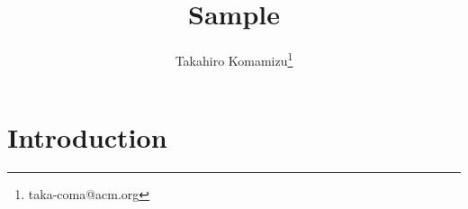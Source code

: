 \documentclass[twocolumn,10pt]{article}
\begin{document}
\title{
	Sample
}

\author{Takahiro Komamizu\thanks{taka-coma@acm.org}}


\date{}

\maketitle

\begin{abstract}
\lipsum[1]
\end{abstract}

\section{Introduction}
\lipsum[2-15]

%
%
\end{document}
